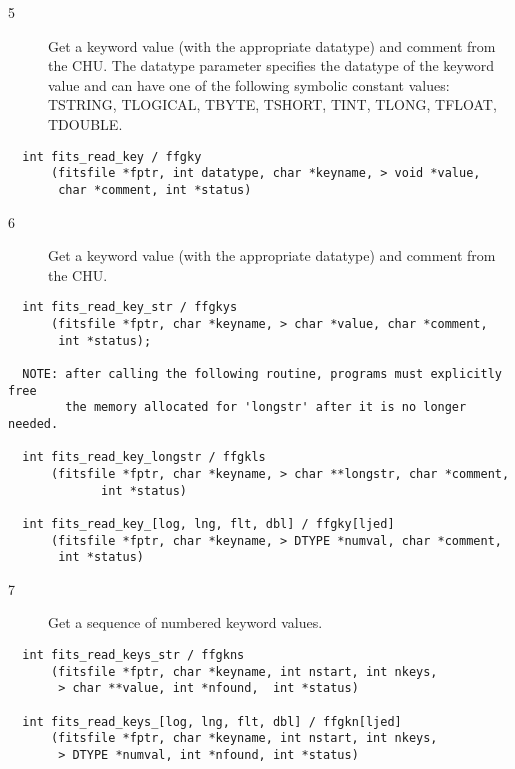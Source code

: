 \begin{description}
\item[5 ] Get a keyword value (with the appropriate datatype) and comment from the
    CHU. The datatype parameter specifies the datatype of the keyword value
    and can have one of the following symbolic constant values:  TSTRING,
   TLOGICAL, TBYTE, TSHORT, TINT, TLONG, TFLOAT, TDOUBLE.
\end{description}

\begin{verbatim}
  int fits_read_key / ffgky
      (fitsfile *fptr, int datatype, char *keyname, > void *value,
       char *comment, int *status)
\end{verbatim}

\begin{description}
\item[6 ] Get a keyword value (with the appropriate datatype) and comment from
   the CHU.
\end{description}

\begin{verbatim}
  int fits_read_key_str / ffgkys
      (fitsfile *fptr, char *keyname, > char *value, char *comment,
       int *status);

  NOTE: after calling the following routine, programs must explicitly free
        the memory allocated for 'longstr' after it is no longer needed.

  int fits_read_key_longstr / ffgkls
      (fitsfile *fptr, char *keyname, > char **longstr, char *comment,
             int *status)

  int fits_read_key_[log, lng, flt, dbl] / ffgky[ljed]
      (fitsfile *fptr, char *keyname, > DTYPE *numval, char *comment,
       int *status)
\end{verbatim}

\begin{description}
\item[7 ] Get a sequence of numbered keyword values.
\end{description}

\begin{verbatim}
  int fits_read_keys_str / ffgkns
      (fitsfile *fptr, char *keyname, int nstart, int nkeys,
       > char **value, int *nfound,  int *status)

  int fits_read_keys_[log, lng, flt, dbl] / ffgkn[ljed]
      (fitsfile *fptr, char *keyname, int nstart, int nkeys,
       > DTYPE *numval, int *nfound, int *status)
\end{verbatim}

